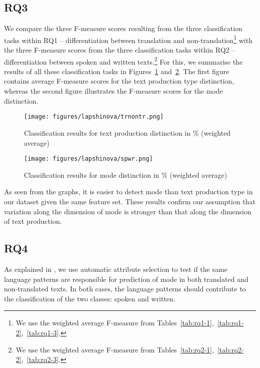 \documentclass[output=paper,colorlinks,citecolor=brown]{langscibook}
\begin{document}
\subsection{RQ3}\label{ssec:rq3}
We compare the three F-measure scores resulting from the three classification tasks within RQ1 -- differentiation between translation and non-translation\footnote{We use the weighted average F-measure from Tables~\ref{tab:rq1-1},~\ref{tab:rq1-2},~\ref{tab:rq1-3}.} with the three F-measure scores from the three classification tasks within RQ2 -- differentiation between spoken and written texts.\footnote{We use the weighted average F-measure from Tables~\ref{tab:rq2-1},~\ref{tab:rq2-2},~\ref{tab:rq2-3}.} For this, we summarise the results of all these classification tasks in Figures~\ref{fig:rq1average} and~\ref{fig:rq2average}. The first figure contains average F-measure scores for the text production type distinction, whereas the second figure illustrates the F-measure scores for the mode distinction. %

\begin{figure}
    \centering
    \texttt{[image: figures/lapshinova/trnontr.png]}
    \caption{Classification results for text production distinction in \% (weighted average)}
    \label{fig:rq1average}
\end{figure}

\begin{figure}
    \centering
    \texttt{[image: figures/lapshinova/spwr.png]}
    \caption{Classification results for mode distinction in \% (weighted average)}
    \label{fig:rq2average}
\end{figure}



As seen from the graphs, it is easier to detect mode than text production type in our dataset given the same feature set. These results confirm our assumption that variation along the dimension of mode is stronger than that along the dimension of text production. 

\subsection{RQ4}\label{ssec:rq4}
As explained in , we use automatic attribute selection to test if the same language patterns are responsible for prediction of mode in both translated and non-translated texts. %
In both cases, the language patterns should contribute to the classification of the two classes: spoken and written.
\end{document}
